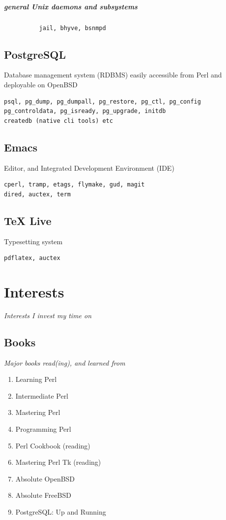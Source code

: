 \documentclass {article}
\begin{document}
    \subparagraph{general Unix daemons and subsystems}
    \begin{verbatim}
          jail, bhyve, bsnmpd
    \end{verbatim}

    \subsection{PostgreSQL}
    Database management system (RDBMS) easily accessible from Perl and deployable on OpenBSD
    \begin{verbatim}
psql, pg_dump, pg_dumpall, pg_restore, pg_ctl, pg_config
pg_controldata, pg_isready, pg_upgrade, initdb
createdb (native cli tools) etc
    \end{verbatim}

    \subsection{Emacs}
    Editor, and Integrated Development Environment (IDE)
    \begin{verbatim}
cperl, tramp, etags, flymake, gud, magit
dired, auctex, term
    \end{verbatim}

    \subsection{TeX Live}
    Typesetting system
    \begin{verbatim}
pdflatex, auctex
    \end{verbatim}


    \section{Interests}
    \textit{Interests I invest my time on}

    \subsection{Books}
    \textit{Major books read(ing), and learned from}
    \begin{enumerate}
        \item{Learning Perl\cite{learning_perl}}
        \item{Intermediate Perl\cite{intermediate_perl}}
        \item{Mastering Perl\cite{mastering_perl}}
        \item{Programming Perl\cite{programming_perl}}
        \item{Perl Cookbook\cite{perl_cookbook}} (reading)
        \item{Mastering Perl Tk\cite{perl_tk}} (reading)
        \item{Absolute OpenBSD\cite{absolute_openbsd}}
        \item{Absolute FreeBSD\cite{absolute_freebsd}}
        \item{PostgreSQL: Up and Running\cite{postgresql}}
    \end{enumerate}
\end{document}
